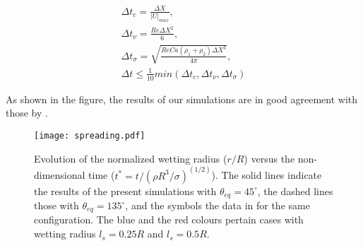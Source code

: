 \documentclass[review]{elsarticle}
\begin{document}
\begin{linenomath}\begin{equation} \label{timestep}
\begin{gathered}
 \Delta t_c = \frac{\Delta X}{{|U|}_{max}}, \\
 \Delta t_\nu = \frac{Re {\Delta X}^2}{6}, \\
 \Delta t_\sigma = \sqrt{\frac{Re  Ca (\rho_1+\rho_2) {\Delta X}^3}{4\pi}}, \\
 \Delta t \le \frac{1}{10} min(\Delta t_c, \Delta t_\nu,\Delta t_\sigma )
 \end{gathered}
\end{equation}\end{linenomath}
 As shown in the figure, the results of our simulations are in good agreement with those by \cite{Nakamura2013}.

\begin{figure} [H]
\centering
\texttt{[image: spreading.pdf]}
\caption{Evolution of the normalized wetting radius ($r/R$) versus the non-dimensional time ($t^*=t/{(\rho R^3/ \sigma)}^{(1/2)}$). The solid lines indicate the results of the present simulations with $\theta_{eq}=45^\circ$, the dashed lines those with $\theta_{eq}=135^\circ$, and the symbols the data in \cite{Nakamura2013} for the same configuration. The blue and the red colours pertain cases with wetting radius $l_s=0.25R$ and $l_s=0.5R$. } 
\label{fig:WettingRadiusPFM}
\end{figure}
\end{document}
